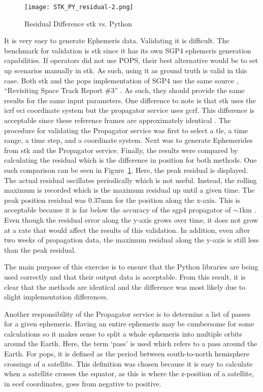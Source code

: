 \begin{figure}[h]
    \centering
    \texttt{[image: STK\_PY\_residual-2.png]} 
    \caption{Residual Difference \gls{stk} vs. Python}
    \label{fig:stk_py} 
\end{figure}

It is very easy to generate Ephemeris data. Validating it is difficult.  The
benchmark for validation is \gls{stk} since it has its own SGP4 ephemeris
generation capabilities. If operators did not use POPS, their best alternative
would be to set up scenarios manually in \gls{stk}. As such, using it as ground
truth is valid in this case. Both \gls{stk} and the \gls{pops} implementation
of SGP4 use the same source \cite{kelso_celestrak_2022}, ``Revisiting Space
Track Report \#3'' \cite{vallado_revisiting_2006}.  As such, they should
provide the same results for the same input parameters.  One difference to note
is that \gls{stk} uses the \gls{icrf} \gls{eci} coordinate system but the
propagator service uses \gls{gcrf}.  This difference is acceptable since these
reference frames are approximately identical \cite{kaplan_iau_2006}.  The
procedure for validating the Propagator service was first to select a
\gls{tle}, a time range, a time step, and a coordinate system.  Next was to
generate Ephemerides from \gls{stk} and the Propagator service.  Finally, the
results were compared by calculating the residual which is the difference in
position for both methods. One such comparison can be seen in
Figure~\ref{fig:stk_py}.  Here, the peak residual is displayed. The actual
residual oscillates periodically which is not useful. Instead, the rolling
maximum is recorded which is the maximum residual up until a given time.  The
peak position residual was 0.37mm for the position along the x-axis.  This is
acceptable because it is far below the accuracy of the \gls{sgp4} propagator of
$\sim1$km \cite{vallado_revisiting_2006}. Even though the residual error along
the y-axis grows over time, it does not grow at a rate that would affect the
results of this validation. In addition, even after two weeks of propagation
data, the maximum residual along the y-axis is still less than the peak
residual. 

The main purpose of this exercise is to ensure that the Python libraries are
being used correctly and that their output data is acceptable.  From this
result, it is clear that the methods are identical and the difference was most
likely due to slight implementation differences. 

Another responsibility of the Propagator service is to determine a list of
passes for a given ephemeris. Having an entire ephemeris may be cumbersome for
some calculations so it makes sense to split a whole ephemeris into multiple
orbits around the Earth. Here, the term `pass' is used which refers to a pass
around the Earth. For \gls{pops}, it is defined as the period between
south-to-north hemisphere crossings of a satellite. This definition was chosen
because it is easy to calculate when a satellite crosses the equator, as this
is where the z-position of a satellite, in \gls{ecef} coordinates, goes from
negative to positive.

